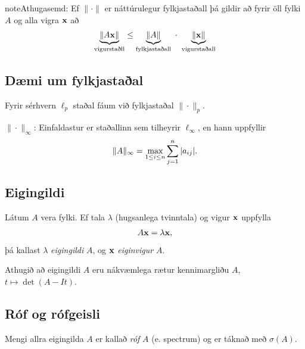 \documentclass[letterpaper,10pt,icelandic]{sphinxmanual}
\begin{document}
\begin{notice}{note}{Athugasemd:}
Ef \(\|\cdot\|\) er náttúrulegur fylkjastaðall þá gildir að fyrir
öll fylki \(A\) og alla vigra \(\mbox{${\bf x}$}\) að
\begin{gather}
\begin{split}\underbrace{\|A\mbox{${\bf x}$}\|}_{\text{vigurstaðll}}
\leq \underbrace{\|A\|}_{\text{fylkjastaðall}} \ \cdot \
\underbrace{\|\mbox{${\bf x}$}\|}_{\text{vigurstaðall}}\end{split}\notag
\end{gather}\end{notice}


\subsection{Dæmi um fylkjastaðal}
\label{kafli08:daemi-um-fylkjastaal}
Fyrir sérhvern \(\ell_p\) staðal fáum við fylkjastaðal
\(\|\cdot\|_p\).

\(\|\cdot\|_\infty\):
Einfaldastur er staðallinn sem tilheyrir \(\ell_\infty\), en hann uppfyllir
\begin{gather}
\begin{split}\|A\|_\infty = \max_{1\leq i \leq n} \sum_{j=1}^n |a_{ij}|.\end{split}\notag
\end{gather}

\subsection{Eigingildi}
\label{kafli08:eigingildi}\label{kafli08:index-11}
Látum \(A\) vera fylki. Ef tala \(\lambda\) (hugsanlega
tvinntala) og vigur \(\mbox{${\bf x}$}\) uppfylla
\begin{gather}
\begin{split}A\mbox{${\bf x}$}= \lambda \mbox{${\bf x}$},\end{split}\notag
\end{gather}
þá kallast \(\lambda\) \emph{eigingildi} \(A\), og
\(\mbox{${\bf x}$}\) \emph{eiginvigur} \(A\).

Athugið að eigingildi \(A\) eru nákvæmlega rætur kennimargliðu
\(A\), \(t \mapsto \det(A-It)\).


\subsection{Róf og rófgeisli}
\label{kafli08:index-12}\label{kafli08:rof-og-rofgeisli}
Mengi allra eigingilda \(A\) er kallað \emph{róf} \(A\) (e. spectrum)
og er táknað með \(\sigma(A)\).
\end{document}
